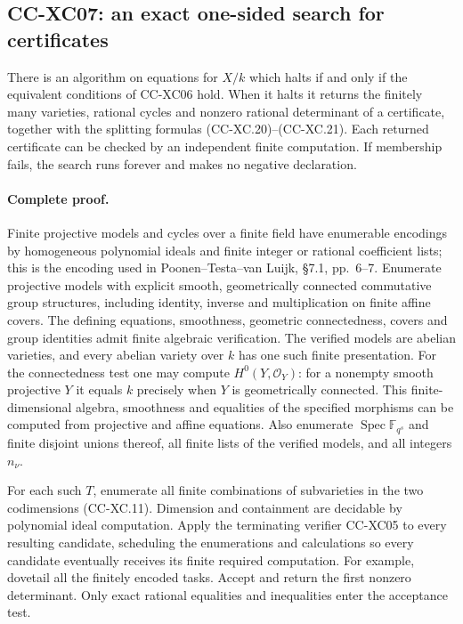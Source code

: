\subsection{CC-XC07: an exact one-sided search for certificates}

There is an algorithm on equations for \(X/k\) which halts
if and only if the equivalent conditions of CC-XC06 hold.
When it halts it returns the finitely many varieties,
rational cycles and nonzero rational determinant of a
certificate, together with the splitting formulas
(CC-XC.20)--(CC-XC.21).  Each returned certificate can
be checked by an independent finite computation.
If membership fails, the search runs forever and makes
no negative declaration.

\paragraph{Complete proof.}
Finite projective models and cycles over a finite field
have enumerable encodings by homogeneous polynomial
ideals and finite integer or rational coefficient lists;
this is the encoding used in Poonen--Testa--van Luijk,
\S7.1, pp.~6--7.  Enumerate projective models with explicit
smooth, geometrically connected commutative group
structures, including identity, inverse and multiplication
on finite affine covers.  The defining equations,
smoothness, geometric connectedness, covers and group
identities admit finite algebraic verification.  The
verified models are abelian varieties, and every abelian
variety over \(k\) has one such finite presentation.
For the connectedness test one may compute
\(H^0(Y,\mathcal O_Y)\): for a nonempty smooth projective
\(Y\) it equals \(k\) precisely when \(Y\) is geometrically
connected.  This finite-dimensional algebra, smoothness
and equalities of the specified morphisms can be computed
from projective and affine equations.
Also enumerate \(\operatorname{Spec}\mathbb F_{q^s}\)
and finite disjoint unions thereof, all finite lists of
the verified models, and all integers \(n_\nu\).

For each such \(T\), enumerate all finite combinations of
subvarieties in the two codimensions (CC-XC.11).
Dimension and containment are decidable by polynomial
ideal computation.  Apply the terminating verifier
CC-XC05 to every resulting candidate, scheduling the
enumerations and calculations so every candidate
eventually receives its finite required computation.
For example, dovetail all the finitely encoded tasks.
Accept and return the first nonzero determinant.
Only exact rational equalities and inequalities enter
the acceptance test.

